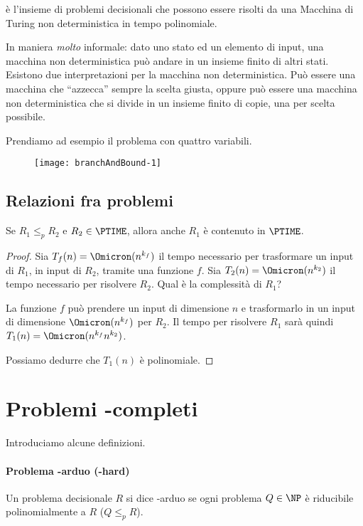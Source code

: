 {\NP} è l'insieme di problemi decisionali che possono essere risolti da una Macchina di Turing non deterministica in tempo polinomiale.

In maniera \emph{molto} informale: dato uno stato ed un elemento di input, una macchina non deterministica può andare in un insieme finito di altri stati.
Esistono due interpretazioni per la macchina non deterministica.
Può essere una macchina che \enquote{azzecca} sempre la scelta giusta, oppure può essere una macchina non deterministica che si divide in un insieme finito di copie, una per scelta possibile.

Prendiamo ad esempio il problema {\sat} con quattro variabili.

\begin{figure}[H]\centering
    \texttt{[image: branchAndBound-1]}
\end{figure}

\subsection{Relazioni fra problemi}

\begin{lemma}
Se \(R_1 \leqslant_p R_2\) e \(R_2 \in \PTIME\), allora anche \(R_1\) è contenuto in \(\PTIME\).
\end{lemma}

\begin{proof}
Sia \(T_f(n) = \Omicron(n^{k_f})\) il tempo necessario per trasformare un input di \(R_1\), in input di \(R_2\), tramite una funzione \(f\).
Sia \(T_2(n) = \Omicron(n^{k_2})\) il tempo necessario per risolvere \(R_2\).
Qual è la complessità di \(R_1\)?

La funzione \(f\) può prendere un input di dimensione \(n\) e trasformarlo in un input di dimensione \(\Omicron(n^{k_f})\) per \(R_2\).
Il tempo per risolvere \(R_1\) sarà quindi \(T_1(n) = \Omicron(n^{k_f} n^{k_2})\).

Possiamo dedurre che \(T_1(n)\) è polinomiale.
\end{proof}

\section{Problemi \NP-completi}

Introduciamo alcune definizioni.

\paragraph{Problema {\NP}-arduo ({\NP}-hard)}
Un problema decisionale \(R\) si dice {\NP}-arduo se ogni problema \(Q \in \NP\) è riducibile polinomialmente a \(R\) (\(Q \leqslant_p R\)).

